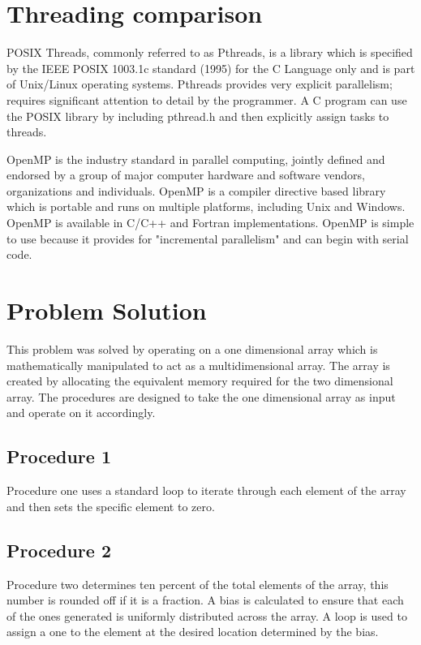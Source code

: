 \documentclass{TechReport}
\begin{document}
 \section{Threading comparison}
 POSIX Threads, commonly referred to as Pthreads, is a library which is specified by the IEEE POSIX 1003.1c standard (1995) 
 for the C Language only and is part of Unix/Linux operating systems.
 Pthreads provides very explicit parallelism; requires significant attention to detail by the programmer. 
 A C program can use the POSIX library by including pthread.h and then explicitly assign tasks to threads. 

OpenMP is the industry standard in parallel computing, jointly defined and endorsed by a group of major computer hardware and software vendors, organizations and individuals.
    OpenMP is a compiler directive based library which is portable and runs on multiple platforms, including Unix and Windows.
    OpenMP is available in C/C++ and Fortran implementations.
    OpenMP is simple to use because it provides for "incremental parallelism" and can begin with serial code. 
 
\section{Problem Solution}
This problem was solved by operating on a one dimensional array which is mathematically manipulated to act as a multidimensional array.  The array is created by allocating the equivalent memory required for the two dimensional array. The procedures are designed to take the one dimensional array as input and operate on it accordingly. 

\subsection{Procedure 1}
Procedure one uses a standard loop to iterate through each element of the array and then sets the specific element to zero.

\subsection{Procedure 2}
Procedure two determines ten percent of the total elements of the array, this number is rounded off if it is a fraction. A bias is calculated to ensure that each of the ones generated is uniformly distributed across the array. A loop is used to assign a one to the element at the desired location determined by the bias.
\end{document}
